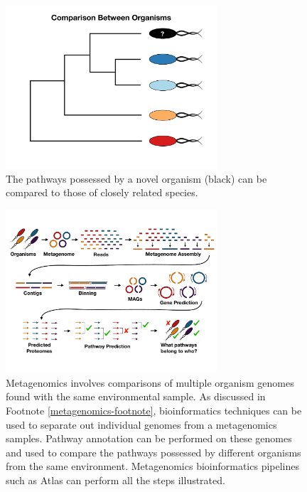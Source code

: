 \begin{figure}[!ht]
  \centering
	\includegraphics[width=0.7\textwidth]{media/compare-phylogenetically.pdf}
	 \caption{The pathways possessed by a novel organism (black) can be compared to those of closely related species.}
	 \label{fig:phylogenetic-comparison}
\end{figure}

\begin{figure}[!ht]
  \centering
	\includegraphics[width=0.7\textwidth]{media/metagenomics.pdf}
	 \caption{Metagenomics involves comparisons of multiple organism genomes found with the same environmental sample. As discussed in Footnote \ref{metagenomics-footnote}, bioinformatics techniques can be used to separate out individual genomes from a metagenomics samples. Pathway annotation can be performed on these genomes and used to compare the pathways possessed by different organisms from the same environment. Metagenomics bioinformatics pipelines such as Atlas can perform all the steps illustrated.}
	 \label{fig:metagenomics}
\end{figure}

